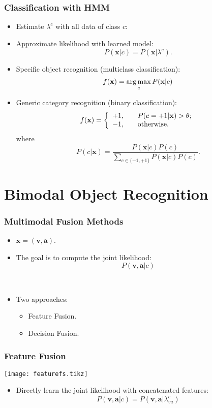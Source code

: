 \documentclass{beamer}
\begin{document}
\begin{frame}
  \frametitle{Classification with HMM}

  \begin{itemize}
    \item Estimate $\lambda^c$ with all data of class $c$:
     
    \item Approximate likelihood with learned model:
      \[ P(\mathbf{x}|c) = P(\mathbf{x}|\lambda^c) . \]
    \item Specific object recognition (multiclass classification):
      \[ f(\mathbf{x}) = \operatorname*{arg\,max}_{c} P(\mathbf{x}|c) \]
    \item Generic category recognition (binary classification):
      \[ 
        f(\mathbf{x}) = \left\{
          \begin{array}{l l}
            +1, & \quad P(c=+1|\mathbf{x}) > \theta; \\
            -1, & \quad \text{otherwise.}
          \end{array} \right.
        \]
        where
        \[ P(c|\mathbf{x}) = \frac{P(\mathbf{x}|c)P(c)}{\sum_{c \in \{-1,+1\}} P(\mathbf{x}|c)P(c)} . \]
    \end{itemize}
  \end{frame}

  \section{Bimodal Object Recognition}
  \begin{frame}
    \frametitle{Multimodal Fusion Methods}

    \begin{itemize}
      \item $\mathbf{x} = (\mathbf{v},\mathbf{a})$.
      \item The goal is to compute the joint likelihood:
        \[ P(\mathbf{v},\mathbf{a}|c) \]

        ~
      \item Two approaches:
        \begin{itemize}
          \item Feature Fusion.
          \item Decision Fusion.
        \end{itemize}
    \end{itemize}
  \end{frame}

  \begin{frame}
    \frametitle{Feature Fusion}

    \centering
    \texttt{[image: featurefs.tikz]}

    \begin{itemize}
      \item Directly learn the joint likelihood with concatenated features:
        \[ P(\mathbf{v},\mathbf{a}|c) = P(\mathbf{v},\mathbf{a}|\lambda_{va}^c) \]
    \end{itemize}
  \end{frame}
\end{document}
